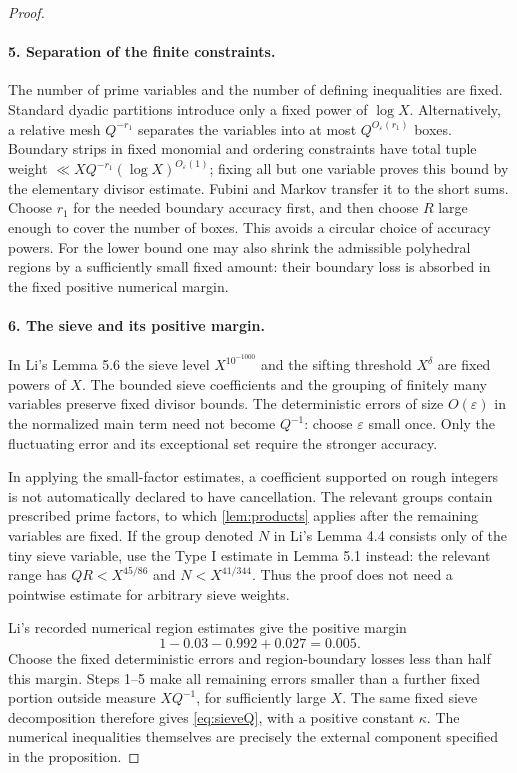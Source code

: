 \documentclass[11pt,a4paper]{article}
\theoremstyle{remark}
\newcommand{\eps}{\varepsilon}
\begin{document}
\begin{proof}
\paragraph{5. Separation of the finite constraints.}
The number of prime variables and the number of defining inequalities
are fixed. Standard dyadic partitions introduce only a fixed power
of $\log X$. Alternatively, a relative mesh $Q^{-r_1}$ separates the
variables into at most $Q^{O_\eps(r_1)}$ boxes.
Boundary strips in fixed monomial and ordering constraints have
total tuple weight $\ll XQ^{-r_1}(\log X)^{O_\eps(1)}$; fixing all but
one variable proves this bound by the elementary divisor estimate.
Fubini and Markov transfer it to the short sums.
Choose $r_1$ for the needed boundary accuracy first, and then choose
$R$ large enough to cover the number of boxes.
This avoids a circular choice of accuracy powers.
For the lower bound one may also shrink the admissible polyhedral
regions by a sufficiently small fixed amount: their boundary loss is
absorbed in the fixed positive numerical margin.

\paragraph{6. The sieve and its positive margin.}
In Li's Lemma 5.6 the sieve level $X^{10^{-1000}}$ and the sifting
threshold $X^\delta$ are fixed powers of $X$.
The bounded sieve coefficients and the grouping of finitely many
variables preserve fixed divisor bounds. The deterministic errors of
size $O(\eps)$ in the normalized main term need not become $Q^{-1}$:
choose $\eps$ small once. Only the fluctuating error and its exceptional
set require the stronger accuracy.

In applying the small-factor estimates, a coefficient supported on
rough integers is not automatically declared to have cancellation.
The relevant groups contain prescribed prime factors, to which
\cref{lem:products} applies after the remaining variables are fixed.
If the group denoted $N$ in Li's Lemma 4.4 consists only of the tiny
sieve variable, use the Type I estimate in Lemma 5.1 instead:
the relevant range has $QR<X^{45/86}$ and $N<X^{41/344}$.
Thus the proof does not need a pointwise estimate for arbitrary
sieve weights.

Li's recorded numerical region estimates give the positive margin
\[
                  1-0.03-0.992+0.027=0.005.
\]
Choose the fixed deterministic errors and region-boundary losses less
than half this margin. Steps 1--5 make all remaining errors smaller
than a further fixed portion outside measure $XQ^{-1}$, for sufficiently
large $X$. The same fixed sieve decomposition therefore gives
\eqref{eq:sieveQ}, with a positive constant $\kappa$.
The numerical inequalities themselves are precisely the external
component specified in the proposition.
\end{proof}
\end{document}
